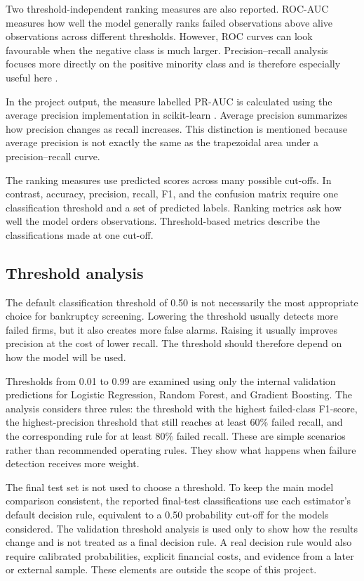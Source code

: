 \documentclass[11pt,a4paper]{article}
\begin{document}
Two threshold-independent ranking measures are also reported. ROC-AUC measures
how well the model generally ranks failed observations above alive observations
across different thresholds. However, ROC curves can look
favourable when the negative class is much larger. Precision--recall analysis
focuses more directly on the positive minority class and is therefore especially
useful here \citep{davis2006}.

In the project output, the measure labelled PR-AUC is calculated using the
average precision implementation in scikit-learn \citep{pedregosa2011}.
Average precision summarizes how precision changes as recall increases. This
distinction is mentioned because average precision is not exactly the same as
the trapezoidal area under a precision--recall curve.

The ranking measures use predicted scores across many possible cut-offs. In
contrast, accuracy, precision, recall, F1, and the confusion matrix require one
classification threshold and a set of predicted labels. Ranking metrics ask how
well the model orders observations. Threshold-based metrics describe the
classifications made at one cut-off.

\subsection{Threshold analysis}

The default classification threshold of 0.50 is not necessarily the most
appropriate choice for bankruptcy screening. Lowering the threshold usually
detects more failed firms, but it also creates more false alarms. Raising it
usually improves precision at the cost of lower recall. The threshold should
therefore depend on how the model will be used.

Thresholds from 0.01 to 0.99 are examined using only the internal validation
predictions for Logistic Regression, Random Forest, and Gradient Boosting. The
analysis considers three rules: the threshold with the highest failed-class
F1-score, the highest-precision threshold that still reaches at least 60\%
failed recall, and the corresponding rule for at least 80\% failed recall.
These are simple scenarios rather than recommended operating rules. They show
what happens when failure detection receives more weight.

The final test set is not used to choose a threshold. To keep the main model
comparison consistent, the reported final-test classifications use each
estimator's default decision rule, equivalent to a 0.50 probability cut-off for
the models considered. The validation threshold analysis is used only to show
how the results change and is not treated as a final decision rule. A real decision rule would also
require calibrated probabilities, explicit financial costs, and evidence from a
later or external sample. These elements are outside the scope of this project.
\end{document}
